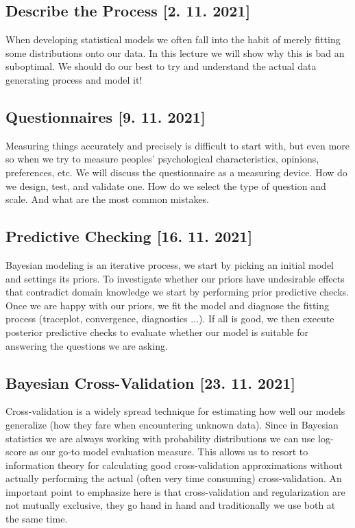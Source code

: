 \documentclass[fleqn,moreauthors,10pt]{ds_report}
\begin{document}
\subsection*{Describe the Process [2. 11. 2021]}

When developing statistical models we often fall into the habit of merely fitting some distributions onto our data. In this lecture we will show why this is bad an suboptimal. We should do our best to try and understand the actual data generating process and model it!

\subsection*{Questionnaires [9. 11. 2021]}

Measuring things accurately and precisely is difficult to start with, but even more so when we try to measure peoples' psychological characteristics, opinions, preferences, etc. We will discuss the questionnaire as a measuring device. How do we design, test, and validate one. How do we select the type of question and scale. And what are the most common mistakes.

\subsection*{Predictive Checking [16. 11. 2021]}

Bayesian modeling is an iterative process, we start by picking an initial model and settings its priors. To investigate whether our priors have undesirable effects that contradict domain knowledge we start by performing prior predictive checks. Once we are happy with our priors, we fit the model and diagnose the fitting process (traceplot, convergence, diagnostics ...). If all is good, we then execute posterior predictive checks to evaluate whether our model is suitable for answering the questions we are asking.

\subsection*{Bayesian Cross-Validation [23. 11. 2021]}

Cross-validation is a widely spread technique for estimating how well our models generalize (how they fare when encountering unknown data). Since in Bayesian statistics we are always working with probability distributions we can use log-score as our go-to model evaluation measure. This allows us to resort to information theory for calculating good cross-validation approximations without actually performing the actual (often very time consuming) cross-validation. An important point to emphasize here is that cross-validation and regularization are not mutually exclusive, they go hand in hand and traditionally we use both at the same time.
\end{document}
